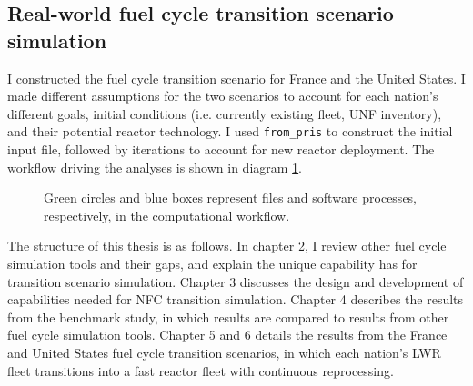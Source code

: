 \subsection{Real-world fuel cycle transition scenario simulation}
I constructed the fuel cycle transition scenario for France and the United States.
I made different assumptions for the two scenarios to account for each nation's different goals,
initial conditions (i.e. currently existing fleet, \gls{UNF} inventory), and their potential reactor
technology. I used \texttt{from\_pris} to construct the initial \Cyclus input file,
followed by iterations to account for new reactor deployment. The workflow driving the analyses is shown in diagram \ref{diag:workflow}.


\begin{figure}
        \centering
{}
\caption{Green circles and blue boxes represent files and software 
processes, respectively, in the computational workflow.}
\label{diag:workflow}
\end{figure}


The structure of this thesis is as follows. In chapter 2, I review other fuel cycle simulation
tools and their gaps, and explain the unique capability \Cyclus
has for transition scenario simulation.
Chapter 3 discusses the design and
development of capabilities needed for \gls{NFC} transition simulation.
Chapter 4 describes the results from the benchmark study, in which \Cyclus results are compared
to results from other fuel cycle simulation tools.
Chapter 5 and 6 details the results from the France and United States fuel cycle
transition scenarios, in which each nation's \gls{LWR} fleet transitions into
a fast reactor fleet with continuous reprocessing.
